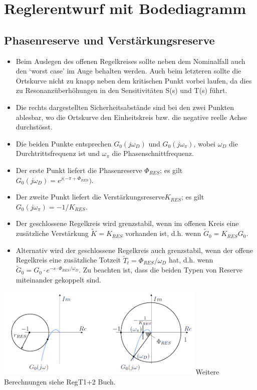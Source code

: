 \section{Reglerentwurf mit Bodediagramm }

\subsection{Phasenreserve und Verstärkungsreserve }
\begin{multicols}{2}
\begin{itemize}
\item Beim Auslegen des offenen Regelkreises sollte neben dem Nominalfall
auch den ‘worst case’ im Auge behalten werden. Auch beim letzteren sollte die
Ortskurve nicht zu knapp neben dem kritischen Punkt vorbei laufen, da dies zu
Resonanzüberhöhungen in den Sensitivitäten S(s) und T(s) führt.
\item Die rechts dargestellten Sicherheitsabstände sind bei den zwei Punkten ablesbar,
wo die Ortskurve den Einheitskreis bzw. die negative reelle Achse durchstösst.
\item Die beiden Punkte entsprechen $G_0(j\omega_D)$ und $G_0(j\omega_{\pi})$, wobei $\omega_D$ die Durchtrittsfrequenz
ist und $\omega_{\pi}$ die Phasenschnittfrequenz.
\item Der erste Punkt liefert die Phasenreserve $\Phi_{RES}$; es gilt $G_0(j\omega_D) = e^{j(-\pi+\Phi_{RES}})$. 
\item Der zweite Punkt liefert die Verstärkungsreserve$K_{RES}$; es gilt $G_0(j\omega_{\pi}) = -1/K_{RES}$. 
\item Der geschlossene Regelkreis wird grenzstabil, wenn im offenen Kreis eine zusätzliche Verstärkung $\widetilde{K} = K_{RES}$ vorhanden ist, d.h. wenn $\widetilde{G}_0 = K_{RES}G_0$.
\item Alternativ wird der geschlossene Regelkreis auch grenzstabil, wenn der offene Regelkreis eine zusätzliche Totzeit $\widetilde{T}_t = \Phi_{RES}/\omega_D$ hat,
d.h. wenn $\widetilde{G}_0 = G_0\cdot e^{-s\cdot\Phi_{RES}/\omega_D}$. Zu beachten ist, dass die beiden Typen von Reserve
miteinander gekoppelt sind.
\end{itemize}
		\includegraphics[width=10cm]{./images/PhasenVerstaerkungReserve.png}
\hspace*{2.5cm}Weitere Berechnungen siehe RegT1+2 Buch.
\end{multicols}
